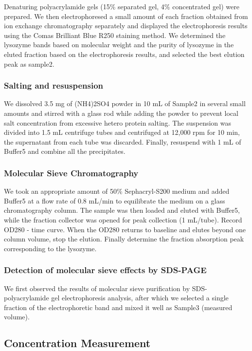 Denaturing polyacrylamide gels (15\% separated gel, 4\% concentrated
gel) were prepared. We then electrophoresed a small amount of each
fraction obtained from ion exchange chromatography separately and
displayed the electrophoresis results using the Comas Brilliant Blue
R250 staining method. We determined the lysozyme bands based on
molecular weight and the purity of lysozyme in the eluted fraction based
on the electrophoresis results, and selected the best elution peak as
sample2.

\subsubsection{Salting and resuspension}

We dissolved 3.5 mg of (NH4)2SO4 powder in 10 mL of Sample2 in several
small amounts and stirred with a glass rod while adding the powder to
prevent local salt concentration from excessive hetero protein salting.
The suspension was divided into 1.5 mL centrifuge tubes and centrifuged
at 12,000 rpm for 10 min, the supernatant from each tube was discarded.
Finally, resuspend with 1 mL of Buffer5 and combine all the
precipitates.

\subsubsection{Molecular Sieve Chromatography}

We took an appropriate amount of 50\% Sephacryl-S200 medium and added
Buffer5 at a flow rate of 0.8 mL/min to equilibrate the medium on a
glass chromatography column. The sample was then loaded and eluted with
Buffer5, while the fraction collector was opened for peak collection (1
mL/tube). Record OD280 - time curve. When the OD280 returns to baseline
and elutes beyond one column volume, stop the elution. Finally determine
the fraction absorption peak corresponding to the lysozyme.

\subsubsection{Detection of molecular sieve effects by SDS-PAGE}

We first observed the results of molecular sieve purification by
SDS-polyacrylamide gel electrophoresis analysis, after which we selected
a single fraction of the electrophoretic band and mixed it well as
Sample3 (measured volume).

\hypertarget{concentration-measurement}{%
	\subsection{Concentration Measurement}\label{concentration-measurement}}

